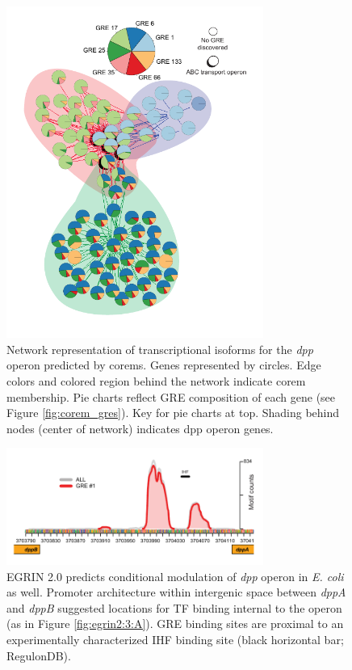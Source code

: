 \begin{figure}[h!]
    \centering
    \includegraphics[width=0.75\textwidth]{figures/dpp_networks}
 	\caption[Network representation of transcriptional isoforms for the \textit{dpp} operon predicted by corems, \halo]{Network representation of transcriptional isoforms for the \textit{dpp} operon predicted by corems. Genes represented by circles. Edge colors and colored region behind the network indicate corem membership. Pie charts reflect GRE composition of each gene (see Figure \ref{fig:corem_gres}). Key for pie charts at top. Shading behind nodes (center of network) indicates dpp operon genes.
}
    \label{fig:dpp_networks}
\end{figure}

\begin{figure}[h!]
    \centering
    \includegraphics[width=0.75\textwidth]{figures/dpp_ecoli}
 	\caption[Evidence for condition-specific transcript isoforms of the \textit{dpp} operon in \textit{E. coli}]{EGRIN 2.0 predicts conditional modulation of \textit{dpp} operon in \textit{E. coli} as well. Promoter architecture within intergenic space between \textit{dppA} and \textit{dppB} suggested locations for TF binding internal to the operon (as in Figure \ref{fig:egrin2:3:A}). GRE binding sites are proximal to an experimentally characterized IHF binding site (black horizontal bar; RegulonDB).
}
    \label{fig:dpp_ecoli}
\end{figure}

